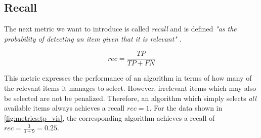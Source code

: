 \subsection{Recall}
\label{chp:fundamentals:sec:metrics:subsec:Recall}

The next metric we want to introduce is called \textit{recall} and is defined \textit{"as the probability of detecting an item given that it is relevant"} \parencite{Zhu:2004}.

\begin{equation}\label{eq:recall}
    rec = \frac{TP}{TP+FN}
\end{equation}

This metric expresses the performance of an algorithm in terms of how many of the relevant items it manages to select.
However, irrelevant items which may also be selected are not be penalized.
Therefore, an algorithm which simply selects \textit{all} available items always achieves a recall $rec=1$.
For the data shown in \cref{fig:metrics:tp_vis}, the corresponding algorithm achieves a recall of $rec = \frac{3}{3+9} = 0.25$.
